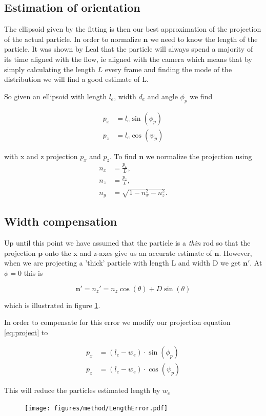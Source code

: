 \subsection{Estimation of orientation}

The ellipsoid given by the fitting is then our best approximation of the projection of the actual particle. In order to normalize $\mathbf{n}$ we need to know the length of the particle. It was shown by Leal \cite{Leal} that the particle will always spend a majority of its time aligned with the flow, ie aligned with the camera which means that by simply calculating the length $L$ every frame and finding the mode of the distribution we will find a good estimate of L. 

So given an ellipsoid with length $l_e$, width $d_e$ and angle $\phi_p$ we find 

\begin{align} \label{eq:project}
p_x  &= l_e \sin(\phi_p) \\
p_z  &= l_e \cos(\psi_p) 
\end{align}

with x and z projection $p_x$ and $p_z$. To find $\mathbf{n}$ we normalize the projection using
\begin{subequations}\label{eq:normalize}
\begin{align}
n_x 	&= \frac{p_x}{L}, \\
n_z 	&= \frac{p_z}{L}, \\
n_y		&= \sqrt{1 - n_x^2 - n_z^2}.
\end{align}
\end{subequations}


\subsection{Width compensation}\label{sec:width_compensation}
Up until this point we have assumed that the particle is a \emph{thin} rod so that the projection $\mathbf{p}$ onto the x and z-axes give us an accurate estimate of $\mathbf{n}$. However, when we are projecting a 'thick' particle with length L and width D we get $\mathbf{n}'$. At $\phi = 0$ this is

\begin{equation}
\mathbf{n}' = n_z' = n_z\cos(\theta)  + D\sin(\theta) 
\end{equation}

which is illustrated in figure \ref{fig:lengtherror}. 

In order to compensate for this error we modify our projection equation \ref{eq:project} to

\begin{align}\label{eq:widthCompensation}
p_x  &= (l_e - w_e)\cdot \sin(\phi_p) \\
p_z  &= (l_e - w_e)\cdot \cos(\psi_p) 
\end{align}

This will reduce the particles estimated length by $w_e$
\begin{figure}[H]
\centering
\texttt{[image: figures/method/LengthError.pdf]}
\caption{}\label{fig:lengtherror}
\end{figure} 

